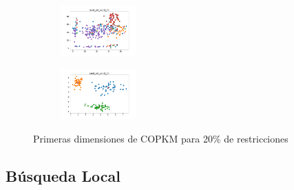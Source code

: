 \begin{figure}[H]
\begin{subfigure}
    \end{subfigure}
    \hfill
    \begin{subfigure}
        \centering
        \includegraphics[width=0.32\textwidth]{img/copkm/ecoli_set_const_20_3773969821_clust.png}
    \end{subfigure}
    \hfill
    \begin{subfigure}
        \centering
        \includegraphics[width=0.32\textwidth]{img/copkm/rand_set_const_20_3773969821_clust.png}
    \end{subfigure}
    \caption{Primeras dimensiones de COPKM para 20\% de restricciones}
\end{figure}

\newpage

\subsection{Búsqueda Local}

